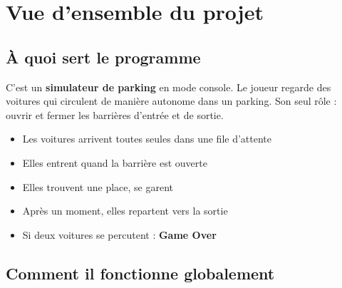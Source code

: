 \documentclass[11pt,a4paper]{article}
\newcommand{\important}[1]{\textcolor{accent}{\textbf{#1}}}
\newcommand{\concept}[1]{\textcolor{primary}{\textbf{#1}}}
\begin{document}
\newpage
\tableofcontents
\newpage

\section{Vue d'ensemble du projet}

\subsection{À quoi sert le programme}

C'est un \concept{simulateur de parking} en mode console. Le joueur regarde des voitures qui circulent de manière autonome dans un parking. Son seul rôle : ouvrir et fermer les barrières d'entrée et de sortie.

\begin{itemize}[noitemsep]
    \item Les voitures arrivent toutes seules dans une file d'attente
    \item Elles entrent quand la barrière est ouverte
    \item Elles trouvent une place, se garent
    \item Après un moment, elles repartent vers la sortie
    \item Si deux voitures se percutent : \important{Game Over}
\end{itemize}

\subsection{Comment il fonctionne globalement}

\begin{center}
\end{center}
\end{document}
